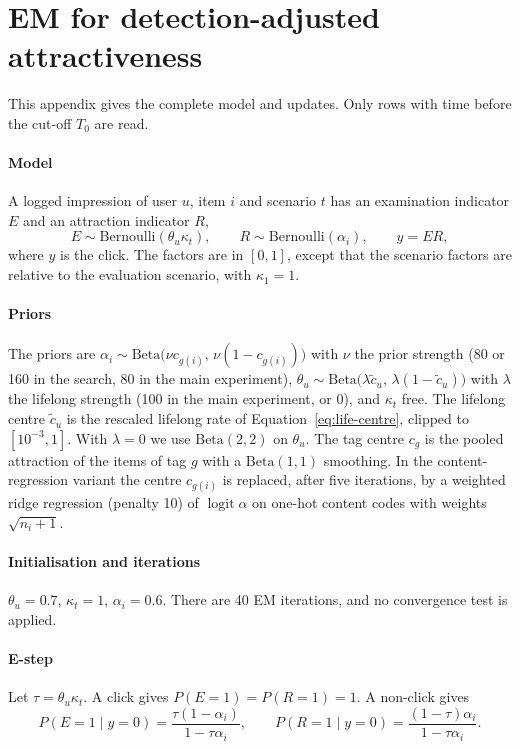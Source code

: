 \section{EM for detection-adjusted attractiveness}\label{app:em}

This appendix gives the complete model and updates. Only rows with time before the cut-off $T_0$ are read.

\paragraph{Model} A logged impression of user $u$, item $i$ and scenario $t$ has an examination indicator $E$ and an attraction indicator $R$,
\[
E\sim\mathrm{Bernoulli}(\theta_u\kappa_t),\qquad R\sim\mathrm{Bernoulli}(\alpha_i),\qquad y=ER,
\]
where $y$ is the click. The factors are in $[0,1]$, except that the scenario factors are relative to the evaluation scenario, with $\kappa_1=1$.

\paragraph{Priors} The priors are $\alpha_i\sim\mathrm{Beta}\bigl(\nu c_{g(i)},\,\nu(1-c_{g(i)})\bigr)$ with $\nu$ the prior strength (80 or 160 in the search,
80 in the main experiment), $\theta_u\sim\mathrm{Beta}\bigl(\lambda\tilde c_u,\,\lambda(1-\tilde c_u)\bigr)$ with $\lambda$ the lifelong strength (100 in the
main experiment, or 0), and $\kappa_t$ free. The lifelong centre $\tilde c_u$ is the rescaled lifelong rate of Equation~\eqref{eq:life-centre}, clipped
to $[10^{-3},1]$. With $\lambda=0$ we use $\mathrm{Beta}(2,2)$ on $\theta_u$. The tag centre $c_g$ is the pooled attraction of the items of tag $g$ with
a $\mathrm{Beta}(1,1)$ smoothing. In the content-regression variant the centre $c_{g(i)}$ is replaced, after five iterations, by a weighted ridge
regression (penalty 10) of $\operatorname{logit}\alpha$ on one-hot content codes with weights $\sqrt{n_i+1}$.

\paragraph{Initialisation and iterations} $\theta_u=0.7$, $\kappa_t=1$, $\alpha_i=0.6$. There are 40 EM iterations, and no convergence test is applied.

\paragraph{E-step} Let $\tau=\theta_u\kappa_t$. A click gives $P(E=1)=P(R=1)=1$. A non-click gives
\[
P(E=1\mid y=0)=\frac{\tau(1-\alpha_i)}{1-\tau\alpha_i},\qquad
P(R=1\mid y=0)=\frac{(1-\tau)\alpha_i}{1-\tau\alpha_i}.
\]

